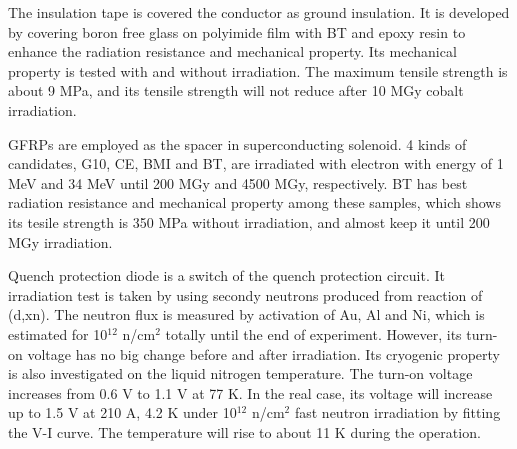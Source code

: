 \documentclass[a4paper, 10pt, twocolumn]{article}
\begin{document}
The insulation tape is covered the conductor as ground insulation.
It is developed by covering boron free glass on polyimide film with BT and epoxy resin to enhance the radiation resistance and mechanical property.
Its mechanical property is tested with and without irradiation.
The maximum tensile strength is about 9 MPa, and its tensile strength will not reduce after 10 MGy cobalt irradiation.

GFRPs are employed as the spacer in superconducting solenoid.
4 kinds of candidates, G10, CE, BMI and BT, are irradiated with electron with energy of 1 MeV and 34 MeV until 200 MGy and 4500 MGy, respectively.
BT has best radiation resistance and mechanical property among these samples, which shows its tesile strength is 350 MPa without irradiation, and almost keep it until 200 MGy irradiation.

Quench protection diode is a switch of the quench protection circuit.
It irradiation test is taken by using secondy neutrons produced from reaction of (d,xn).
The neutron flux is measured by activation of Au, Al and Ni, which is estimated for 10$^{12}$ n/cm$^2$ totally until the end of experiment.
However, its turn-on voltage has no big change before and after irradiation.
Its cryogenic property is also investigated on the liquid nitrogen temperature.
The turn-on voltage increases from 0.6 V to 1.1 V at 77 K.
In the real case, its voltage will increase up to 1.5 V at 210 A, 4.2 K under 10$^{12}$ n/cm$^2$ fast neutron irradiation by fitting the V-I curve.
The temperature will rise to about 11 K during the operation.
\end{document}
